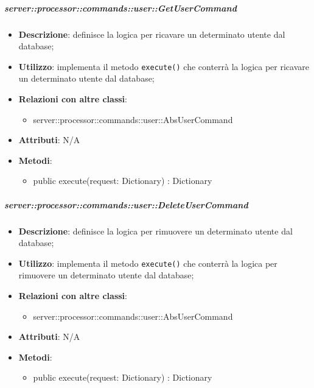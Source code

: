         \subparagraph{server::processor::commands::user::GetUserCommand} %
        \label{subp:bdsm_app_server_processor_commands_user_getusercommand}
        \begin{itemize}
          \item \textbf{Descrizione}: definisce la logica per ricavare un determinato utente dal database;
          \item \textbf{Utilizzo}: implementa il metodo \texttt{execute()} che conterrà la logica per ricavare un determinato utente dal database;
          \item \textbf{Relazioni con altre classi}:
            \begin{itemize}
              \item server::processor::commands::user::AbsUserCommand
            \end{itemize}
			\item \textbf{Attributi}: N/A
			\item \textbf{Metodi}:
        	\begin{itemize}
          		\item public execute(request: Dictionary) : Dictionary
        	\end{itemize}
        \end{itemize}

        \subparagraph{server::processor::commands::user::DeleteUserCommand} %
        \label{subp:bdsm_app_server_processor_commands_user_deleteusercommand}
        \begin{itemize}
          \item \textbf{Descrizione}: definisce la logica per rimuovere un determinato utente dal database;
          \item \textbf{Utilizzo}: implementa il metodo \texttt{execute()} che conterrà la logica per rimuovere un determinato utente dal database;
          \item \textbf{Relazioni con altre classi}:
            \begin{itemize}
              \item server::processor::commands::user::AbsUserCommand
            \end{itemize}
			\item \textbf{Attributi}: N/A
			\item \textbf{Metodi}:
        	\begin{itemize}
          		\item public execute(request: Dictionary) : Dictionary
        	\end{itemize}
        \end{itemize}


